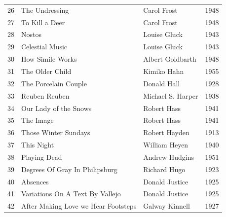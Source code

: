 \documentclass{book}
\begin{document}
\begin{table}[h!]
\begin{tabular}{llll}
26 & The Undressing & Carol Frost & 1948 \\
27 & To Kill a Deer & Carol Frost & 1948 \\
28 & Nostos & Louise Gluck & 1943 \\
29 & Celestial Music & Louise Gluck & 1943 \\
30 & How Simile Works & Albert Goldbarth & 1948 \\
31 & The Older Child & Kimiko Hahn & 1955 \\
32 & The Porcelain Couple & Donald Hall & 1928 \\
33 & Reuben Reuben & Michael S. Harper & 1938 \\
34 & Our Lady of the Snows & Robert Hass & 1941 \\
35 & The Image & Robert Hass & 1941 \\
36 & Those Winter Sundays & Robert Hayden & 1913 \\
37 & This Night & William Heyen & 1940 \\
38 & Playing Dead & Andrew Hudgins & 1951 \\
39 & Degrees Of Gray In Philipsburg & Richard Hugo & 1923 \\
40 & Absences & Donald Justice & 1925 \\
41 & Variations On A Text By Vallejo & Donald Justice & 1925 \\
42 & After Making Love we Hear Footsteps & Galway Kinnell & 1927 \\
\bottomrule
\end{tabular}
\end{table}
\end{document}
